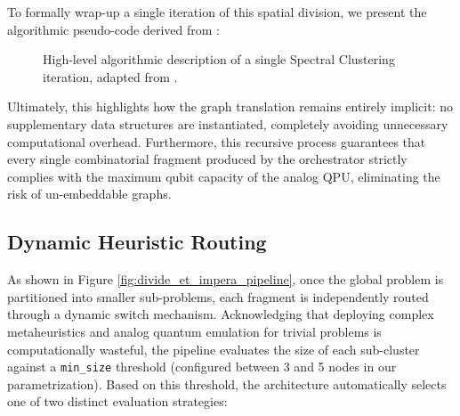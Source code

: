 To formally wrap-up a single iteration of this spatial division, we present the algorithmic pseudo-code derived from \cite{spectral_DM}:

\begin{figure}[H]
    \centering
    \caption{High-level algorithmic description of a single Spectral Clustering iteration, adapted from \cite{spectral_DM}.}
    \label{fig:spectral_algorithm}
\end{figure}

Ultimately, this highlights how the graph translation remains entirely implicit: no supplementary data structures are instantiated, completely avoiding unnecessary computational overhead. Furthermore, this recursive process guarantees that every single combinatorial fragment produced by the orchestrator strictly complies with the maximum qubit capacity of the analog QPU, eliminating the risk of un-embeddable graphs.

\subsection{Dynamic Heuristic Routing}
\label{subsec:dynamic_heuristic_routing}

As shown in Figure \ref{fig:divide_et_impera_pipeline}, once the global problem is partitioned into smaller sub-problems, each fragment is independently routed through a dynamic switch mechanism. Acknowledging that deploying complex metaheuristics and analog quantum emulation for trivial problems is computationally wasteful, the pipeline evaluates the size of each sub-cluster against a \texttt{min\_size} threshold (configured between 3 and 5 nodes in our parametrization). Based on this threshold, the architecture automatically selects one of two distinct evaluation strategies:

